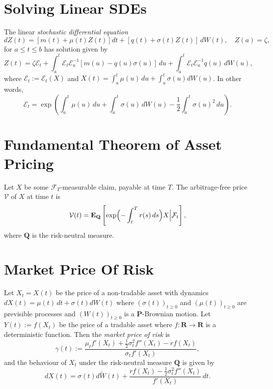 \documentclass[twocolumn]{amsart}
\renewcommand{\P}{\mathbf{P}}
\newcommand{\Q}{\mathbf{Q}}
\newcommand{\EQ}{\mathbf{E}_\mathbf{Q}}
\newcommand{\F}{\mathcal{F}}
\newcommand{\R}{\mathbf{R}}
\newcommand{\sE}{\mathcal{E}}
\newcommand{\tW}{\widetilde W}
\begin{document}
\section*{Solving Linear SDEs}

The linear \emph{stochastic differential equation}
\begin{equation*}
    dZ(t) = [m(t)+\mu(t)Z(t)]dt + [q(t)+\sigma(t)Z(t)]\,dW(t), \quad Z(a) = \zeta,
\end{equation*}
for $a \le t \le b$ has solution given by
\begin{equation*}
    Z(t) = \zeta \sE_t + \int_a^t \sE_t \sE_u^{-1}[m(u)-q(u)\sigma(u)]\,du + \int_a^t \sE_t \sE_u^{-1} q(u)\,dW(u),
\end{equation*}
where $\sE_t := \sE_t(X)$ and $X(t) = \int_a^t\mu(u)\,du + \int_a^t\sigma(u)dW(u)$. In other words,
\begin{equation*}
    \sE_t = \exp\left(\int_a^t\mu(u)\,du + \int_a^t\sigma(u)\,dW(u) - \frac{1}{2} \int_a^t \sigma(u)^2\,du\right).
\end{equation*}


\section*{Fundamental Theorem of Asset Pricing}

Let $X$ be some $\F_T$-measurable claim, payable at time $T$. The arbitrage-free price $\mathcal{V}$ of $X$ at time $t$ is
\begin{equation*}
    \mathcal{V}(t) = \EQ\left[\exp\Bigl(-\int_t^T r(s)\,ds\Bigr) X \Bigl| \F_t \Bigr.\right],
\end{equation*}
where $\Q$ is the risk-neutral measure.

\section*{Market Price Of Risk}

Let $X_t = X(t)$ be the price of a non-tradable asset with dynamics $dX(t) =  \mu(t)\,dt + \sigma(t) dW(t)$ where $(\sigma(t))_{t \ge 0}$ and $(\mu(t))_{t \ge 0}$ are previsible processes and $(W(t))_{t \ge 0}$ is a $\P$-Brownian motion. Let $Y(t) := f(X_t)$ be the price of a tradable asset where $f: \R \to \R$ is a deterministic function. Then the \emph{market price of risk} is
\[ \gamma(t) := \frac{\mu_t f'(X_t) + \frac{1}{2} \sigma_t^2 f''(X_t) - r f(X_t)}{\sigma_t f'(X_t)}, \]
and the behaviour of $X_t$ under the risk-neutral measure $\Q$ is given by
\[ dX(t) = \sigma(t) d \tW(t) + \frac{r f(X_t) - \frac{1}{2} \sigma_t^2 f''(X_t)}{f'(X_t)}\,dt. \]
\end{document}
